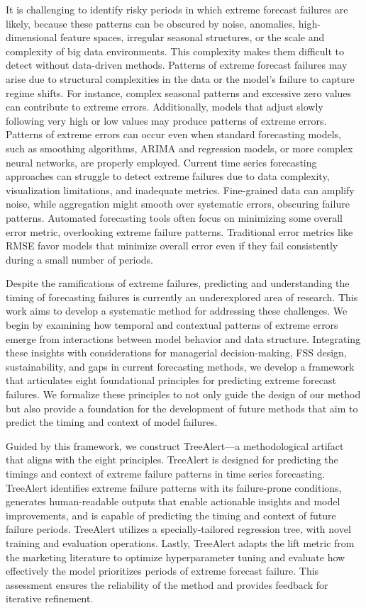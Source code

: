\documentclass[]{interact}
\theoremstyle{definition}
\begin{document}
It is challenging to identify risky periods in which extreme forecast failures are likely, because these patterns can be obscured by noise, anomalies, high-dimensional feature spaces, irregular seasonal structures, or the scale and complexity of big data environments. This complexity makes them difficult to detect without data-driven methods. Patterns of extreme forecast failures may arise due to structural complexities in the data or the model’s failure to capture regime shifts. For instance, complex seasonal patterns and excessive zero values can contribute to extreme errors. Additionally, models that adjust slowly following very high or low values may produce patterns of extreme errors. Patterns of extreme errors can occur even when standard forecasting models, such as smoothing algorithms, ARIMA and %
regression models, or more complex neural networks, are properly employed. Current time series forecasting approaches can struggle to detect extreme failures due to data complexity, visualization limitations, and inadequate metrics. Fine-grained data can amplify noise, while aggregation might smooth over systematic errors, obscuring failure patterns. Automated forecasting tools often focus on minimizing some overall error metric, overlooking extreme failure patterns. Traditional error metrics like RMSE %
favor models that minimize overall error even if they fail consistently during a small number of periods. 

Despite the ramifications of extreme failures, predicting and understanding the timing of forecasting failures is currently an underexplored area of research. This work aims to develop a systematic method for addressing these challenges. We begin by examining how temporal and contextual patterns of extreme errors emerge from interactions between model behavior and data structure. Integrating these insights with considerations for managerial decision-making, FSS design, sustainability, and gaps in current forecasting methods, we develop a framework that articulates eight foundational principles for predicting extreme forecast failures. We formalize these principles to not only guide the design of our method but also provide a foundation for the development of future methods that aim to predict the timing and context of model failures. 

Guided by this framework, we construct TreeAlert---a methodological artifact that aligns with the eight principles. TreeAlert is designed for predicting the timings and context of extreme failure patterns in time series forecasting. TreeAlert identifies extreme failure patterns with its failure-prone conditions, generates human-readable outputs that enable actionable insights and model improvements, and is capable of predicting the timing and context of future failure periods. TreeAlert utilizes a specially-tailored regression tree, with novel training and evaluation operations. Lastly, TreeAlert adapts the lift metric from the marketing literature to optimize hyperparameter tuning and evaluate how effectively the model prioritizes periods of extreme forecast failure. This assessment ensures the reliability of the method and provides feedback for iterative refinement.
\end{document}
